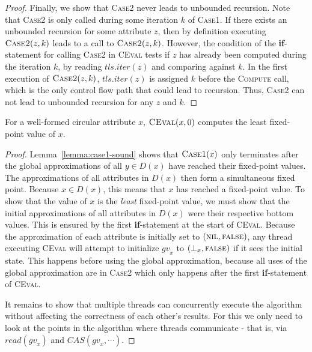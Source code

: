 {\begin{proof}
  Finally, we show that \textsc{Case2} never leads to unbounded recursion.
  Note that \textsc{Case2} is only called during some iteration $k$ of \textsc{Case1}.
  If there exists an unbounded recursion for some attribute $z$,
  then by definition
  executing $\textsc{Case2}(z, k)$ leads to a call to $\textsc{Case2}(z, k)$.
  However, the condition of the \textbf{if}-statement
  for calling \textsc{Case2} in \textsc{CEval} tests if $z$ has already been computed during
  the iteration $k$, by reading $\mathit{tls}.iter(z)$ and comparing against $k$. In the first execution
  of $\textsc{Case2}(z, k)$, $\mathit{tls}.iter(z)$ is assigned $k$ before the \textsc{Compute} call,
  which is the only control flow path that could lead to recursion. Thus, \textsc{Case2} can
  not lead to unbounded recursion for any $z$ and $k$.
\end{proof}

\begin{theorem}
  For a well-formed circular attribute $x$,
  $\textsc{CEval}(x, 0)$ computes the least fixed-point value of $x$.

  \label{theorem:circ-sound}
\end{theorem}

\begin{proof}
  Lemma~\ref{lemma:case1-sound} shows that $\textsc{Case1}(x)$ only terminates after the
  global approximations of all $y \in D(x)$ have reached their fixed-point values.
  The approximations of all attributes in $D(x)$ then form a simultaneous fixed point.
  Because $x \in D(x)$, this means that $x$ has reached a fixed-point value.
  To show that the value of $x$ is the \emph{least} fixed-point value, we must show
  that the initial approximations of all attributes in $D(x)$ were their respective bottom values.
  This is ensured by the first \textbf{if}-statement at the start of
  \textsc{CEval}.  Because the approximation of each attribute is initially set to $(\textsc{nil}, \textsc{false})$,
  any thread executing \textsc{CEval} will attempt to initialize $\mathit{gv}_x$ to $(\bot_x, \textsc{false})$ if it
  sees the initial state. This happens before using the global approximation, because all uses
  of the global approximation are in \textsc{Case2} which only happens after the first
  \textbf{if}-statement of \textsc{CEval}.

  It remains to show that multiple threads can concurrently execute the algorithm without affecting
  the correctness of each other's results. For this we only need to look at the points in the
  algorithm where threads communicate - that is, via $read(\mathit{gv}_x)$ and
  $\mathit{CAS}(\mathit{gv}_x, \cdots)$.


\end{proof}}
